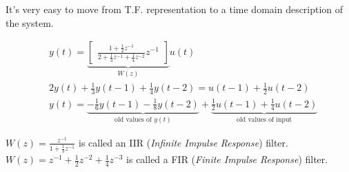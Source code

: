 It's very easy to move from T.F. representation to a time domain description of the system.

\begin{example}
    \begin{align*}
        & y(t) = \underbrace{\begin{bmatrix}
            \frac{1+\frac{1}{2}z^{-1}}{2+\frac{1}{3}z^{-1}+\frac{1}{4}z^{-2}} z^{-1}
        \end{bmatrix}}_{W(z)} u(t) \\
        & 2y(t) + \frac{1}{3}y(t-1) + \frac{1}{4}y(t-2) = u(t-1) + \frac{1}{2}u(t-2) \\
        & y(t) = \underbrace{-\frac{1}{6}y(t-1) - \frac{1}{8}y(t-2)}_\text{old values of $y(t)$} + \underbrace{\frac{1}{2}u(t-1) + \frac{1}{4}u(t-2)}_\text{old values of input}
    \end{align*}

\end{example}
\begin{remark}
    $\displaystyle W(z) = \frac{z^{-1}}{1 + \frac{1}{3}z^{-1}}$ is called an IIR (\emph{Infinite Impulse Response}) filter.\\
    $\displaystyle W(z) = z^{-1} + \frac{1}{2}z^{-2} + \frac{1}{4}z^{-3}$ is called a FIR (\emph{Finite Impulse Response}) filter.
\end{remark}